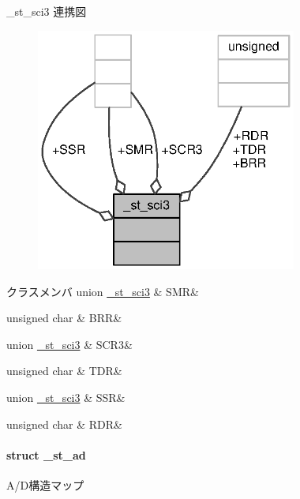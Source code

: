 \+\_\+st\+\_\+sci3 連携図
\nopagebreak
\begin{figure}[H]
\begin{center}
\leavevmode
\includegraphics[width=243pt]{da/d55/struct__st__sci3__coll__graph}
\end{center}
\end{figure}
\begin{DoxyFields}{クラスメンバ}
union \hyperlink{3694s_8h_dc/dd8/union__st__sci3_8SMR}{\+\_\+st\+\_\+sci3}\label{3694s_8h_a34041951c6995fc252828acd04dcf3e1}
&
S\+M\+R&
\\
\hline

unsigned char\label{3694s_8h_a587c5970e05535b33fc4a3cfded8eb92}
&
B\+R\+R&
\\
\hline

union \hyperlink{3694s_8h_db/db8/union__st__sci3_8SCR3}{\+\_\+st\+\_\+sci3}\label{3694s_8h_a07f3d91d1cddafa34e96a41121b3a4ca}
&
S\+C\+R3&
\\
\hline

unsigned char\label{3694s_8h_a9ca783ad97fb9034eaa2866669bf599e}
&
T\+D\+R&
\\
\hline

union \hyperlink{3694s_8h_dc/def/union__st__sci3_8SSR}{\+\_\+st\+\_\+sci3}\label{3694s_8h_a1afcbf7161183009a989883d389a51ab}
&
S\+S\+R&
\\
\hline

unsigned char\label{3694s_8h_a28685dfd3d9dc9b2b38af111dc46c948}
&
R\+D\+R&
\\
\hline

\end{DoxyFields}
\label{struct__st__ad}
\paragraph{struct \+\_\+st\+\_\+ad}
A/\+D構造マップ 


